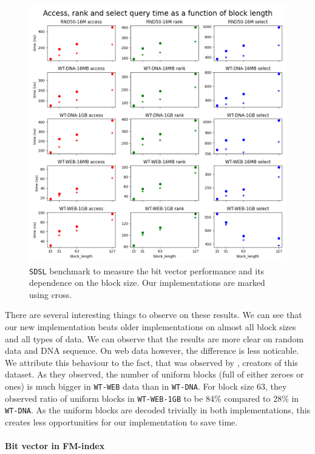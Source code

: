 \begin{figure}
	\centerline{
		\includegraphics[width=\textwidth, height=0.7\textheight]{images/benchmark_sdsl_new_method}
	}
	\caption[TODO]{\texttt{SDSL} benchmark to measure the bit vector performance and its dependence
	on the block size. Our implementations are marked using cross.
	}
	\label{obr:benchmark_sdsl_new_method}
\end{figure}

There are several interesting things to observe on these results. We can see that our new implementation
beats older implementations on almost all block sizes and all types of data. We can observe that the
results are more clear on random data and DNA sequence. On web data however, the difference is less
noticable. We attribute this behaviour to the fact, that was observed by \cite{gog2014optimized},
creators of this dataset. As they observed, the number of uniform blocks (full of either zeroes or ones)
is much bigger in \texttt{WT-WEB} data than in \texttt{WT-DNA}. For block size 63, they observed ratio of
uniform blocks in \texttt{WT-WEB-1GB} to be 84\% compared to 28\% in \texttt{WT-DNA}. As the uniform
blocks are decoded trivially in both implementations, this creates less opportunities for our implementation
to save time.

\paragraph{Bit vector in FM-index}

